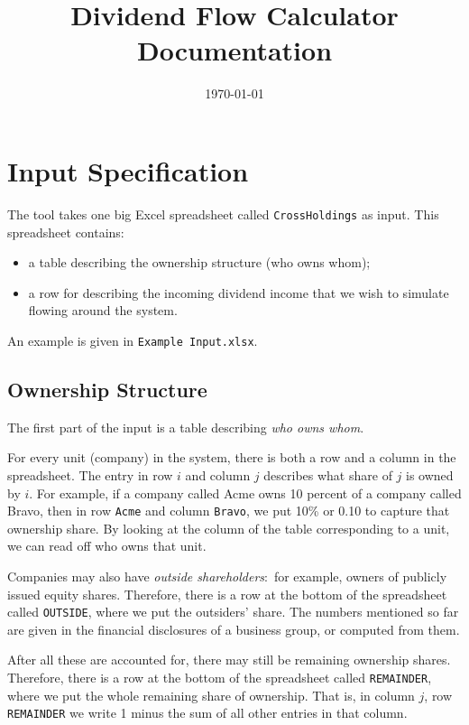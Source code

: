 \documentclass[a4paper,12pt,reqno]{amsart}
\theoremstyle{definition} \newtheorem{example}{Example}
\theoremstyle{definition} \newtheorem{condition}{Condition}
\theoremstyle{definition} \newtheorem{corollary}{Corollary}
\theoremstyle{definition} \newtheorem{claim}{Claim}
\theoremstyle{definition} \newtheorem{definition}{Definition}
\theoremstyle{definition} \newtheorem{conjecture}{Conjecture}
\theoremstyle{definition} \newtheorem{lemma}{Lemma}
\theoremstyle{definition} \newtheorem{theorem}{Theorem}
\theoremstyle{definition} \newtheorem*{theoremNoNumber}{Theorem}
\theoremstyle{definition} \newtheorem*{lemmaCorrespondence}{Lemma \ref{lem:correspondence}}
\theoremstyle{definition}\newtheorem{proposition}{Proposition}
\theoremstyle{definition} \newtheorem{result}{Result}
\theoremstyle{definition} \newtheorem*{definitionNoNumber}{Definition}
\theoremstyle{definition} \newtheorem{assumption}{Assumption}
\theoremstyle{definition} \newtheorem*{assumptionNoNumber}{Assumption}
\theoremstyle{definition} \newtheorem*{fact}{Fact}
\theoremstyle{definition} \newtheorem*{property}{Property}
\theoremstyle{definition} \newtheorem{remark}{Remark}
\begin{document}
\title{Dividend Flow Calculator Documentation}
\date{\today}
\maketitle



\section{Input Specification}

The tool takes one big Excel spreadsheet called {\tt CrossHoldings} as input. This spreadsheet contains: \begin{itemize} \item a table describing the ownership structure (who owns whom); \item a row for describing the incoming dividend income that we wish to simulate flowing around the system.\end{itemize}

An example is given in {\tt Example Input.xlsx}.

\subsection{Ownership Structure} \label{sec:ownership-input}

The first part of the input is a table describing \emph{who owns whom}. 

For every unit (company) in the system, there is both a row and a column in the spreadsheet. The entry in row $i$ and column $j$ describes what share of $j$ is owned by $i$. For example,  if a company called Acme owns 10 percent of a company called Bravo, then in row {\tt Acme} and column {\tt Bravo}, we put 10\% or 0.10 to capture that ownership share. By looking at the column of the table corresponding to a unit, we can read off who owns that unit. 

Companies may also have \emph{outside shareholders}:\ for example, owners of publicly issued equity shares. Therefore, there is a row at the bottom of the spreadsheet called {\tt OUTSIDE}, where we put the outsiders' share.
The numbers mentioned so far are given in the financial disclosures of a business group, or computed from them.

After all these are accounted for, there may still be remaining  ownership shares. Therefore, there is a row at the bottom of the spreadsheet called {\tt REMAINDER}, where we put the whole remaining share of ownership. That is, in column $j$, row {\tt REMAINDER} we write 1 minus the sum of all other entries in that column.
\end{document}
